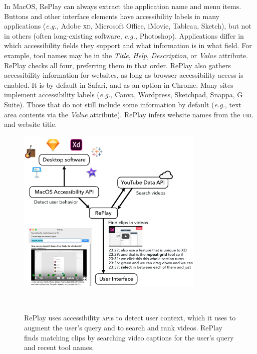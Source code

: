 In Mac\-OS, RePlay can always extract the application name and menu items. Buttons and other interface elements have accessibility labels in many applications (\textit{e.g.,} Adobe \textsc{xd}, Microsoft Office, iMovie, Tableau, Sketch), but not in others (often long-existing software, \textit{e.g.,} Photoshop). Applications differ in which accessibility fields they support and what information is in what field. For example, tool names may be in the \textit{Title}, \textit{Help}, \textit{Description}, or \textit{Value} attribute. RePlay checks all four, preferring them in that order. RePlay also gathers accessibility information for websites, as long as browser accessibility access is enabled. It is by default in Safari, and as an option in Chrome. Many sites implement accessibility labels (\textit{e.g., } Canva, Wordpress, Sketchpad, Snappa, G Suite). Those that do not still include some information by default (\textit{e.g.}, text area contents via the \textit{Value} attribute). RePlay infers website names from the \textsc{url} and website title.

\begin{figure}[b!]
\centering
  \includegraphics[width=0.8\textwidth]{replay/figures/replay-system.png}
  \caption{RePlay uses accessibility \textsc{api}s to detect user context, which it uses to augment the user's query and to search and rank videos. RePlay finds matching clips by searching video captions for the user's query and recent tool names. }~\label{fig:replay-system}
\end{figure}

